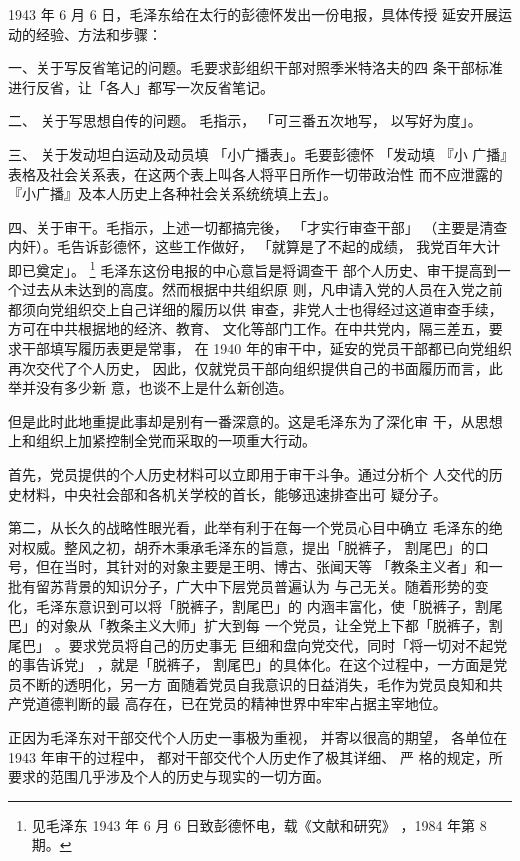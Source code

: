 1943 年 6 月 6 日，毛泽东给在太行的彭德怀发出一份电报，具体传授
延安开展运动的经验、方法和步骤：

一、关于写反省笔记的问题。毛要求彭组织干部对照季米特洛夫的四
条干部标准进行反省，让「各人」都写一次反省笔记。

二、
关于写思想自传的问题。
毛指示，
「可三番五次地写，
以写好为度」。

三、
关于发动坦白运动及动员填
「小广播表」。毛要彭德怀
「发动填
『小
广播』表格及社会关系表，在这两个表上叫各人将平日所作一切带政治性
而不应泄露的『小广播』及本人历史上各种社会关系统统填上去」。

四、关于审干。毛指示，上述一切都搞完後，
「才实行审查干部」
（主要是清查内奸）。毛告诉彭德怀，这些工作做好，
「就算是了不起的成绩，
我党百年大计即已奠定」。
\footnote{见毛泽东 1943 年 6 月 6 日致彭德怀电，载《文献和研究》
，1984 年第 8 期。}
毛泽东这份电报的中心意旨是将调查干
部个人历史、审干提高到一个过去从未达到的高度。然而根据中共组织原
则，凡申请入党的人员在入党之前都须向党组织交上自己详细的履历以供
审查，非党人士也得经过这道审查手续，方可在中共根据地的经济、教育、
文化等部门工作。在中共党内，隔三差五，要求干部填写履历表更是常事，
在 1940 年的审干中，延安的党员干部都已向党组织再次交代了个人历史，
因此，仅就党员干部向组织提供自己的书面履历而言，此举并没有多少新
意，也谈不上是什么新创造。

但是此时此地重提此事却是别有一番深意的。这是毛泽东为了深化审
干，从思想上和组织上加紧控制全党而采取的一项重大行动。

首先，党员提供的个人历史材料可以立即用于审干斗争。通过分析个
人交代的历史材料，中央社会部和各机关学校的首长，能够迅速排查出可
疑分子。

第二，从长久的战略性眼光看，此举有利于在每一个党员心目中确立
毛泽东的绝对权威。整风之初，胡乔木秉承毛泽东的旨意，提出「脱裤子，
割尾巴」的口号，但在当时，其针对的对象主要是王明、博古、张闻天等
「教条主义者」和一批有留苏背景的知识分子，广大中下层党员普遍认为
与己无关。随着形势的变化，毛泽东意识到可以将「脱裤子，割尾巴」的
内涵丰富化，使「脱裤子，割尾巴」的对象从「教条主义大师」扩大到每
一个党员，让全党上下都「脱裤子，割尾巴」
。要求党员将自己的历史事无
巨细和盘向党交代，同时「将一切对不起党的事告诉党」
，就是「脱裤子，
割尾巴」的具体化。在这个过程中，一方面是党员不断的透明化，另一方
面随着党员自我意识的日益消失，毛作为党员良知和共产党道德判断的最
高存在，已在党员的精神世界中牢牢占据主宰地位。

正因为毛泽东对干部交代个人历史一事极为重视，
并寄以很高的期望，
各单位在 1943 年审干的过程中，
都对干部交代个人历史作了极其详细、
严
格的规定，所要求的范围几乎涉及个人的历史与现实的一切方面。

